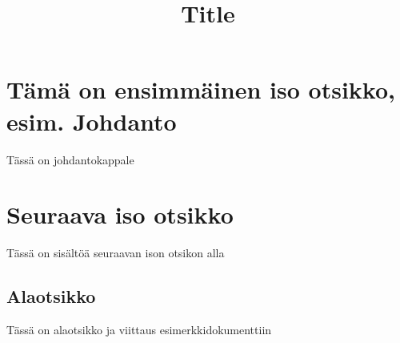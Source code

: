 \documentclass[a4paper]{report}
\begin{document}
\title{\huge Title}
\maketitle

\large

\section{Tämä on ensimmäinen iso otsikko, esim. Johdanto}

Tässä on johdantokappale

\section{Seuraava iso otsikko}

Tässä on sisältöä seuraavan ison otsikon alla

\subsection{Alaotsikko}

Tässä on alaotsikko ja viittaus esimerkkidokumenttiin \citep{koski2012}




\end{document}
